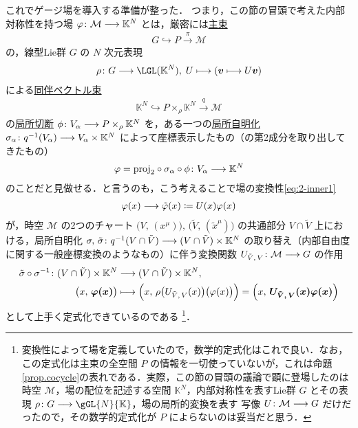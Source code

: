 \documentclass[TQFT_main]{subfiles}
\begin{document}
これでゲージ場を導入する準備が整った．
つまり，この節の冒頭で考えた内部対称性を持つ場 $\varphi \colon \mathcal{M} \longrightarrow \mathbb{K}^N$ とは，厳密には\hyperref[def.PFD]{主束}
\begin{align}
    G \hookrightarrow P \xrightarrow{\pi} \mathcal{M}
\end{align}
の，線型Lie群 $G$ の $N$ 次元表現
\begin{align}
    \rho \colon G \lto \LGL (\mathbb{K}^N),\; U \lmto (\bm{v} \lmto U\bm{v})
\end{align}
による\hyperref[def:associated-vect]{同伴ベクトル束}
\begin{align}
    \mathbb{K}^N \hookrightarrow P \times_\rho \mathbb{K}^N \xrightarrow{q} \mathcal{M}
\end{align}
の\hyperref[def.section]{局所切断} $\phi \colon V_\alpha \longrightarrow P \times_\rho \mathbb{K}^N$ を，ある一つの\hyperref[def.fiber-1]{局所自明化} $\sigma_\alpha \colon q^{-1}(V_\alpha) \longrightarrow V_\alpha \times \mathbb{K}^N$ によって座標表示したもの（の第2成分を取り出してきたもの）
\begin{align}
    \varphi = \mathrm{proj}_2 \circ \sigma_\alpha \circ \phi \colon V_\alpha \longrightarrow \mathbb{K}^N
\end{align}
のことだと見做せる．と言うのも，こう考えることで場の変換性\eqref{eq:2-inner1}
\begin{align}
    \varphi(x) \longrightarrow \tilde{\varphi}(x) \coloneqq U(x) \varphi (x)
\end{align}
が，時空 $\mathcal{M}$ の2つのチャート $\bigl(V,\, (x^\mu)\bigr),\, \bigl(\tilde{V},\, (\tilde{x}^\mu)\bigr)$ の共通部分 $V \cap \tilde{V}$ 上における，局所自明化 $\sigma,\, \tilde{\sigma} \colon q^{-1} (V \cap \tilde{V}) \longrightarrow (V \cap \tilde{V}) \times \mathbb{K}^N$ の取り替え（内部自由度に関する一般座標変換のようなもの）に伴う変換関数 $U_{\tilde{V},\, V} \colon \mathcal{M} \longrightarrow G$ の作用
\begin{align}
    \tilde{\sigma} \circ \sigma^{-1} \colon (V \cap \tilde{V}) \times \mathbb{K}^N &\longrightarrow (V \cap \tilde{V}) \times \mathbb{K}^N, \\
    \bigl(x,\, \bm{\varphi(x)}\bigr) &\longmapsto \Bigl(x,\, \rho\bigl(U_{\tilde{V},\, V}(x)\bigr)\bigl( \varphi(x) \bigr) \Bigr) = \Bigl( x,\, \bm{U_{\tilde{V},\, V} (x) \varphi(x)} \Bigr) \label{eq:field-locsym}
\end{align}
として上手く定式化できているのである
\footnote{
    変換性によって場を定義していたので，数学的定式化はこれで良い．なお，この定式化は主束の全空間 $P$ の情報を一切使っていないが，これは命題\ref{prop.cocycle}の表れである．実際，この節の冒頭の議論で顕に登場したのは時空 $\mathcal{M}$，場の配位を記述する空間 $\mathbb{K}^N$，内部対称性を表すLie群 $G$ とその表現 $\rho \colon G \lto \gGL{N}{\mathbb{K}}$，場の局所的変換を表す \cinfty 写像 $U \colon \mathcal{M} \longrightarrow G$ だけだったので，その数学的定式化が $P$ によらないのは妥当だと思う．
}．
\end{document}
